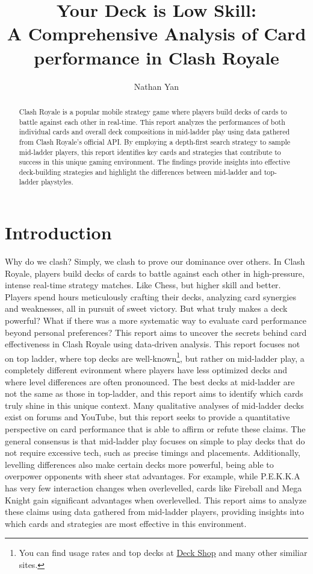 \documentclass{article}
\title{Your Deck is Low Skill: \\ A Comprehensive Analysis of Card performance in Clash Royale}
\author{Nathan Yan}
\begin{document}
\maketitle
\clearpage
\hypersetup{allcolors=black}
\tableofcontents
\hypersetup{allcolors=blue}  %
\clearpage

\begin{abstract}
    Clash Royale is a popular mobile strategy game where players build decks of cards to battle against each other in real-time. This report analyzes the performances of both individual cards and overall deck compositions in mid-ladder play using data gathered from Clash Royale's official API. By employing a depth-first search strategy to sample mid-ladder players, this report identifies key cards and strategies that contribute to success in this unique gaming environment. The findings provide insights into effective deck-building strategies and highlight the differences between mid-ladder and top-ladder playstyles.
\end{abstract}

\section{Introduction}
Why do we clash? Simply, we clash to prove our dominance over others. In Clash Royale, players build decks of cards to battle against each other in high-pressure, intense real-time strategy matches. Like Chess, but higher skill and better. Players spend hours meticulously crafting their decks, analyzing card synergies and weaknesses, all in pursuit of sweet victory. But what truly makes a deck powerful? What if there was a more systematic way to evaluate card performance beyond personal preferences? This report aims to uncover the secrets behind card effectiveness in Clash Royale using data-driven analysis. This report focuses not on top ladder, where top decks are well-known\footnote{You can find usage rates and top decks at \href{https://www.deckshop.pro/}{Deck Shop} and many other similiar sites.}, but rather on mid-ladder play, a completely different evironment where players have less optimized decks and where level differences are often pronounced. The best decks at mid-ladder are not the same as those in top-ladder, and this report aims to identify which cards truly shine in this unique context. Many qualitative analyses of mid-ladder decks exist on forums and YouTube, but this report seeks to provide a quantitative perspective on card performance that is able to affirm or refute these claims. The general consensus is that mid-ladder play focuses on simple to play decks that do not require excessive tech, such as precise timings and placements. Additionally, levelling differences also make certain decks more powerful, being able to overpower opponents with sheer stat advantages. For example, while P.E.K.K.A has very few interaction changes when overlevelled, cards like Fireball and Mega Knight gain significant advantages when overlevelled. This report aims to analyze these claims using data gathered from mid-ladder players, providing insights into which cards and strategies are most effective in this environment.
\end{document}
